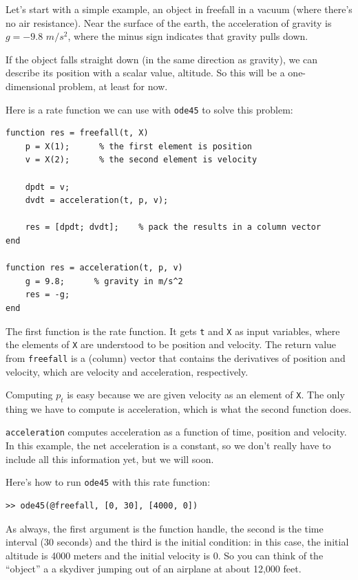 \documentclass{book}
\begin{document}
Let's start with a simple example, an object in freefall in a vacuum
(where there's no air resistance).  Near the surface of the earth, the
acceleration of gravity is $g = -9.8$ $m/s^2$, where the minus sign
indicates that gravity pulls down.

If the object falls straight down (in the same direction as gravity),
we can describe its position with a scalar value, altitude.  So
this will be a one-dimensional problem, at least for now.

Here is a rate function we can use with {\tt ode45} to solve
this problem:

\begin{verbatim}
function res = freefall(t, X)
    p = X(1);      % the first element is position
    v = X(2);      % the second element is velocity

    dpdt = v;                          
    dvdt = acceleration(t, p, v);

    res = [dpdt; dvdt];    % pack the results in a column vector
end

function res = acceleration(t, p, v)
    g = 9.8;      % gravity in m/s^2
    res = -g;
end
\end{verbatim}

The first function is the rate function.  It gets {\tt t} and
{\tt X} as input variables, where the elements of {\tt X} are understood
to be position and velocity.  The return value from {\tt freefall}
is a (column) vector that contains the derivatives of position
and velocity, which are velocity and acceleration, respectively. 

Computing $p_t$ is easy because we are given velocity
as an element of {\tt X}.  The only thing we have to compute is
acceleration, which is what the second function does.

{\tt acceleration} computes acceleration as a function of time,
position and velocity.  In this example, the net acceleration is
a constant, so we don't really have to include all this information
yet, but we will soon.

Here's how to run {\tt ode45} with this rate function:

\begin{verbatim}
>> ode45(@freefall, [0, 30], [4000, 0])
\end{verbatim}
 
As always, the first argument is the function handle, the second
is the time interval (30 seconds) and the third is the initial
condition: in this case, the initial altitude is 4000 meters and
the initial velocity is 0.  So you can think of the ``object'' a
a skydiver jumping out of an airplane at about 12,000 feet.
\end{document}
